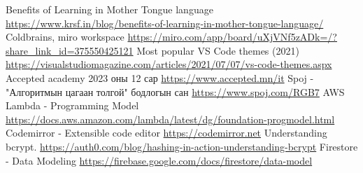 \documentclass[12pt,A4]{report}
\begin{document}
\singlespace
{}
\begin{thebibliography}{}
    Benefits of Learning in Mother Tongue language \url{https://www.krsf.in/blog/benefits-of-learning-in-mother-tongue-language/}
    Coldbrains, miro workspace \url{https://miro.com/app/board/uXjVNf5zADk=/?share_link_id=375550425121}
    Most popular VS Code themes (2021) \url{https://visualstudiomagazine.com/articles/2021/07/07/vs-code-themes.aspx}
    Accepted academy 2023 оны 12 сар \url{https://www.accepted.mn/it}
    Spoj - "Алгоритмын цагаан толгой" бодлогын сан \url{https://www.spoj.com/RGB7}
    AWS Lambda - Programming Model \url{https://docs.aws.amazon.com/lambda/latest/dg/foundation-progmodel.html}
    Codemirror - Extensible code editor \url{https://codemirror.net}
    Understanding bcrypt. \url{https://auth0.com/blog/hashing-in-action-understanding-bcrypt}
    Firestore - Data Modeling \url{https://firebase.google.com/docs/firestore/data-model}
\end{thebibliography}


\appendix
{}


\end{document}
